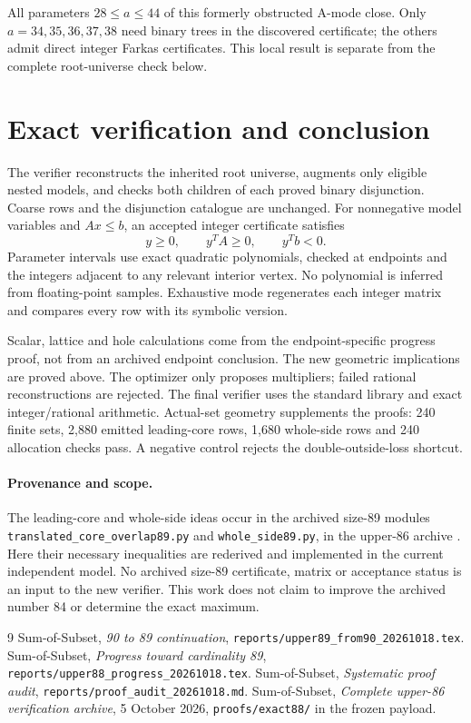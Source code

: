 \documentclass[11pt,a4paper]{article}
\begin{document}
All parameters $28\le a\le44$ of this formerly obstructed A-mode close.
Only $a=34,35,36,37,38$ need binary trees in the discovered certificate;
the others admit direct integer Farkas certificates. This local result
is separate from the complete root-universe check below.

\section{Exact verification and conclusion}\label{verification}
The verifier reconstructs the inherited root universe, augments only
eligible nested models, and checks both children of each proved binary
disjunction. Coarse rows and the disjunction catalogue are unchanged.
For nonnegative model variables and $Ax\le b$, an accepted integer
certificate satisfies
\[
 y\ge0,\qquad y^TA\ge0,\qquad y^Tb<0.
\]
Parameter intervals use exact quadratic polynomials, checked at endpoints
and the integers adjacent to any relevant interior vertex. No polynomial
is inferred from floating-point samples. Exhaustive mode regenerates
each integer matrix and compares every row with its symbolic version.



Scalar, lattice and hole calculations come from the endpoint-specific
progress proof, not from an archived endpoint conclusion.
The new geometric implications are proved above.
The optimizer only proposes multipliers; failed rational reconstructions
are rejected. The final verifier uses the standard library and exact
integer/rational arithmetic. Actual-set geometry supplements the proofs:
240 finite sets, 2,880 emitted leading-core rows, 1,680 whole-side rows
and 240 allocation checks pass. A negative control rejects the
double-outside-loss shortcut.

\paragraph{Provenance and scope.}
The leading-core and whole-side ideas occur in the archived size-89
modules \texttt{translated\_core\_overlap89.py} and
\texttt{whole\_side89.py}, in the upper-86 archive \cite{archive}.
Here their necessary inequalities are rederived and implemented in the
current independent model. No archived size-89 certificate, matrix or
acceptance status is an input to the new verifier. This work does not
claim to improve the archived number 84 or determine the exact maximum.

\begin{thebibliography}{9}
 Sum-of-Subset, \emph{90 to 89 continuation},
\texttt{reports/upper89\_from90\_20261018.tex}.
 Sum-of-Subset, \emph{Progress toward cardinality 89},
\texttt{reports/upper88\_progress\_20261018.tex}.
 Sum-of-Subset, \emph{Systematic proof audit},
\texttt{reports/proof\_audit\_20261018.md}.
 Sum-of-Subset, \emph{Complete upper-86 verification
archive}, 5 October 2026, \texttt{proofs/exact88/} in the frozen payload.
\end{thebibliography}
\end{document}
